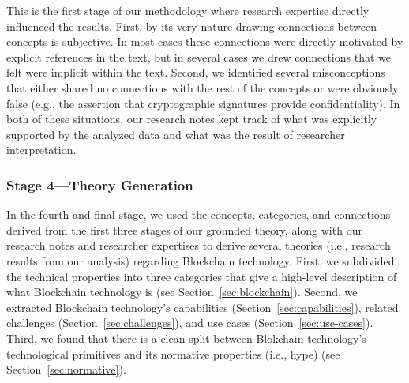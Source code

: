 
This is the first stage of our methodology where research expertise directly influenced the results.
First, by its very nature drawing connections between concepts is subjective.
In most cases these connections were directly motivated by explicit references in the text, but in several cases we drew connections that we felt were implicit within the text.
Second, we identified several misconceptions that either shared no connections with the rest of the concepts or were obviously false (e.g., the assertion that cryptographic signatures provide confidentiality).
In both of these situations, our research notes kept track of what was explicitly supported by the analyzed data and what was the result of researcher interpretation.

\subsubsection{Stage 4---Theory Generation}
In the fourth and final stage, we used the concepts, categories, and connections derived from the first three stages of our grounded theory, along with our research notes and researcher expertises to derive several theories (i.e., research results from our analysis) regarding Blockchain technology.
First, we subdivided the technical properties into three categories that give a high-level description of what Blockchain technology is (see Section~\ref{sec:blockchain}).
Second, we extracted Blockchain technology's capabilities (Section~\ref{sec:capabilities}), related challenges (Section~\ref{sec:challenges}), and use cases (Section~\ref{sec:use-cases}).
Third, we found that there is a clean split between Blokchain technology's technological primitives and its normative properties (i.e., hype) (see Section~\ref{sec:normative}).


